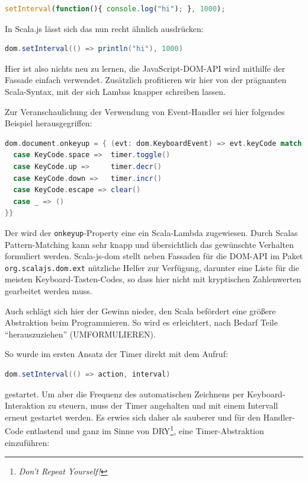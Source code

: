 \documentclass[a4paper, 12pt, hidelinks, listof=totoc, listoftables=totoc, bibliography=totoc]{scrreprt}
\begin{document}
\begin{lstlisting}[language=JavaScript]
setInterval(function(){ console.log("hi"); }, 1000);
\end{lstlisting}

In Scala.js lässt sich das nun recht ähnlich ausdrücken:

\begin{lstlisting}[language=Scala]
dom.setInterval(() => println("hi"), 1000)
\end{lstlisting}

Hier ist also nichts neu zu lernen, die JavaScript-DOM-API wird mithilfe der Fassade einfach verwendet. Zusätzlich profitieren wir hier von der prägnanten Scala-Syntax, mit der sich Lambas knapper schreiben lassen.

Zur Veranschaulichung der Verwendung von Event-Handler sei hier folgendes Beispiel herausgegriffen:

\begin{lstlisting}[language=Scala]
dom.document.onkeyup = { (evt: dom.KeyboardEvent) => evt.keyCode match {
  case KeyCode.space =>  timer.toggle()
  case KeyCode.up =>     timer.decr()
  case KeyCode.down =>   timer.incr()
  case KeyCode.escape => clear()
  case _ => ()
}}
\end{lstlisting}

Der wird der \texttt{onkeyup}-Property eine ein Scala-Lambda zugewiesen. Durch Scalas Pattern-Matching kann sehr knapp und übersichtlich das gewünschte Verhalten formuliert werden. Scala-js-dom stellt neben Fassaden für die DOM-API im Paket \texttt{org.scalajs.dom.ext} nützliche Helfer zur Verfügung, darunter eine Liste für die meisten Keyboard-Tasten-Codes, so dass hier nicht mit kryptischen Zahlenwerten gearbeitet werden muss.

Auch schlägt sich hier der Gewinn nieder, den 
Scala befördert eine größere Abstraktion beim Programmieren. So wird es erleichtert, nach Bedarf Teile "`herauszuziehen"' (UMFORMULIEREN).

So wurde im ersten Ansatz der Timer direkt mit dem Aufruf:

\begin{lstlisting}[language=Scala]
dom.setInterval(() => action, interval)
\end{lstlisting}

gestartet. Um aber die Frequenz des automatischen Zeichnens per Keyboard-Interaktion zu steuern, muss der Timer angehalten und mit einem Intervall erneut gestartet werden. Es erwies sich daher als sauberer und für den Handler-Code entlastend und ganz im Sinne von DRY\footnote{\textit{Don't Repeat Yourself!}}, eine Timer-Abstraktion einzuführen:
\end{document}
